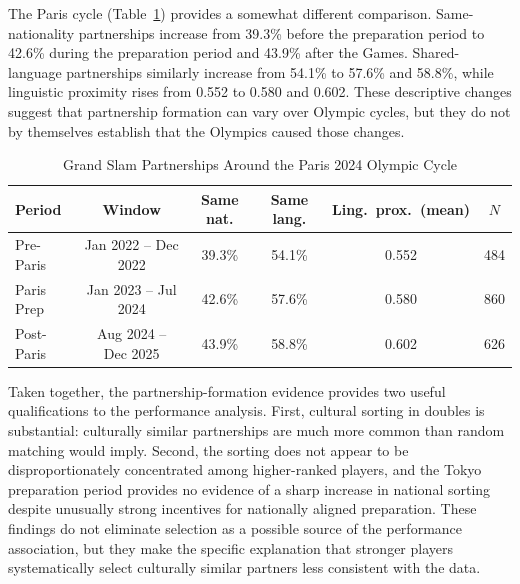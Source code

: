 \documentclass[10pt]{article}
\begin{document}
The Paris cycle (Table~\ref{tab:t2b}) provides a somewhat different comparison. Same-nationality partnerships increase from 39.3\% before the preparation period to 42.6\% during the preparation period and 43.9\% after the Games. Shared-language partnerships similarly increase from 54.1\% to 57.6\% and 58.8\%, while linguistic proximity rises from 0.552 to 0.580 and 0.602. These descriptive changes suggest that partnership formation can vary over Olympic cycles, but they do not by themselves establish that the Olympics caused those changes.

\renewcommand{\thetable}{2B}
\begin{table}[htbp]
\color{blue}
\centering
\caption{Grand Slam Partnerships Around the Paris 2024 Olympic Cycle \label{tab:t2b}}
\begin{threeparttable}
\begin{tabular}{lccccc}
\toprule
Period & Window & Same nat. & Same lang. & Ling.\ prox.\ (mean) & $N$ \\
\midrule
Pre-Paris & Jan 2022 -- Dec 2022 & 39.3\% & 54.1\% & 0.552 & 484 \\
Paris Prep & Jan 2023 -- Jul 2024 & 42.6\% & 57.6\% & 0.580 & 860 \\
Post-Paris & Aug 2024 -- Dec 2025 & 43.9\% & 58.8\% & 0.602 & 626 \\
\bottomrule
\end{tabular}
\end{threeparttable}
\end{table}
\FloatBarrier
\renewcommand{\thetable}{\arabic{table}}

Taken together, the partnership-formation evidence provides two useful qualifications to the performance analysis. First, cultural sorting in doubles is substantial: culturally similar partnerships are much more common than random matching would imply. Second, the sorting does not appear to be disproportionately concentrated among higher-ranked players, and the Tokyo preparation period provides no evidence of a sharp increase in national sorting despite unusually strong incentives for nationally aligned preparation. These findings do not eliminate selection as a possible source of the performance association, but they make the specific explanation that stronger players systematically select culturally similar partners less consistent with the data.
\end{document}
